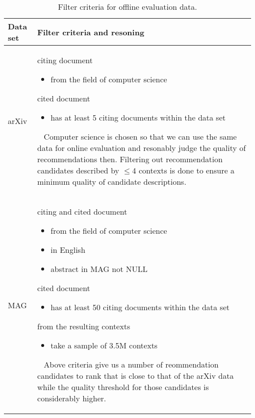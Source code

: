 \begin{table}[]
\centering
    \caption{Filter criteria for offline evaluation data.}
    \label{tab:datasetfilter}
\begin{center}
    \begin{tabular}{lp{11.5cm}}
    \toprule
    Data set & Filter criteria and resoning\\
    \midrule
    arXiv & citing document
            \begin{itemize}
                \item from the field of computer science
            \end{itemize}
            cited document
            \begin{itemize}
                \item has at least 5 citing documents within the data set
            \end{itemize}
            \ 
            \newline
            Computer science is chosen so that we can use the same data for online evaluation and resonably judge the quality of recommendations then.
            \newline
            Filtering out recommendation candidates described by $\le$4 contexts is done to ensure a minimum quality of candidate descriptions.\\
    \midrule
    MAG & citing and cited document
            \begin{itemize}
                \item from the field of computer science
                \item in English
                \item abstract in MAG not NULL
            \end{itemize}
            cited document
            \begin{itemize}
                \item has at least 50 citing documents within the data set
            \end{itemize}
            from the resulting contexts
            \begin{itemize}
                \item take a sample of 3.5M contexts
            \end{itemize}
            \ 
            \newline
            Above criteria give us a number of reommendation candidates to rank that is close to that of the arXiv data while the quality threshold for those candidates is considerably higher.\\

\end{tabular}
\end{center}
\end{table}

